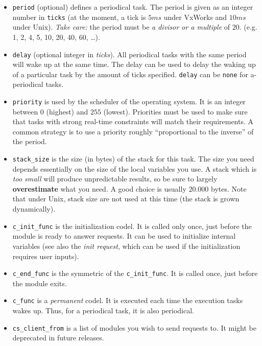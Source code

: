 \begin{itemize}
\item {\tt period} (optional) defines a periodical task. The period is
given as an integer number in {\tt ticks} (at the moment, a tick is $5ms$
under VxWorks and $10ms$ under Unix). {\em Take care:} the period must be
{\em a divisor or a multiple} of $20$. (e.g. 1, 2, 4, 5, 10, 20, 40, 60,
\ldots). 

\item {\tt delay} (optional integer in {\em ticks}). All periodical
tasks with the same period  will wake up at the  same time. The delay can
be used to delay the waking up of a particular task  by the amount of ticks
specified. {\tt delay} can be {\tt none} for  a-periodical tasks.

\item {\tt priority} is used by the scheduler of the operating system. It
is an integer  between $0$ (highest) and  $255$ (lowest). Priorities must
be used to make  sure that tasks  with strong real-time constraints  will
match their requirements.  A common strategy is to use a priority roughly
``proportional to the inverse'' of the period.

\item {\tt stack\_size} is the size (in bytes) of the stack for this
task. The size you  need  depends essentially on   the size of the  local
variables you  use.  A   stack which  is {\em   too small} will   produce
unpredictable results, so be sure  to largely {\bf overestimate} what you
need.   A  good choice is  usually   $20.000$  bytes. Note that under
Unix, stack size are not used at this time (the stack is grown dynamically).

\item {\tt c\_init\_func} is the initialization codel. It is called only
once, just before the module is ready to answer requests.  It can be used
to initialize internal variables (see also  the {\em init request}, which
can be used if the initialization requires user inputs).

\item {\tt c\_end\_func} is the symmetric of the {\tt c\_init\_func}. It
is called once, just before the module exits.

\item {\tt c\_func} is a {\em permanent} codel. It is executed each time
the execution tasks wakes  up. Thus, for  a  periodical task, it is  also
periodical.

\item {\tt cs\_client\_from} is a list of modules you wish to send
requests to. It might be deprecated in future releases.


\end{itemize}
